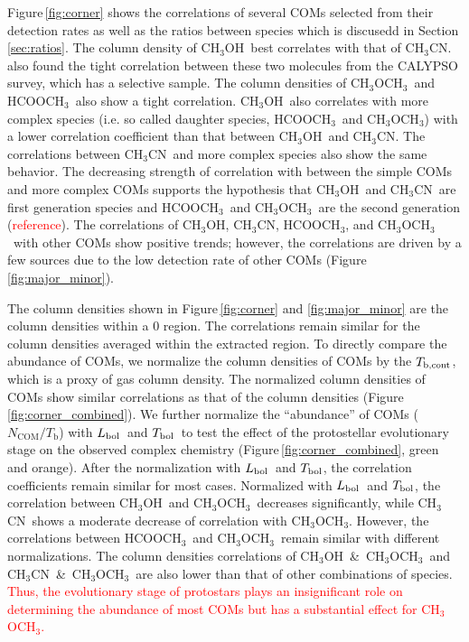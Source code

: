 \documentclass[twocolumn]{aastex62}
\newcommand{\lbol}{\mbox{$L_{\rm bol}$}}
\newcommand{\tbol}{\mbox{$T_{\rm bol}$}}
\newcommand{\tbc}{\mbox{$T_{\rm b, cont}$}}
\newcommand{\methylformate}{\mbox{HCOOCH$_{3}$}}
\newcommand{\methanol}{\mbox{CH$_{3}$OH}}
\newcommand{\dimethylether}{\mbox{CH$_{3}$OCH$_{3}$}}
\newcommand{\methylcyanide}{\mbox{CH$_{3}$CN}}
\newcommand{\refnote}{\textcolor{red}{reference}}
\begin{document}
Figure\,\ref{fig:corner} shows the correlations of several COMs selected from their detection rates as well as the ratios between species which is discusedd in Section\,\ref{sec:ratios}.  The column density of \methanol\ best correlates with that of \methylcyanide.  \citet{2020A&A...635A.198B} also found the tight correlation between these two molecules from the CALYPSO survey, which has a selective sample.  The column densities of \dimethylether\ and \methylformate\ also show a tight correlation.  \methanol\ also correlates with more complex species (i.e. so called daughter species, \methylformate\ and \dimethylether) with a lower correlation coefficient than that between \methanol\ and \methylcyanide.  The correlations between \methylcyanide\ and more complex species also show the same behavior.  The decreasing strength of correlation with between the simple COMs and more complex COMs supports the hypothesis that \methanol\ and \methylcyanide\ are first generation species and \methylformate\ and \dimethylether\ are the second generation (\refnote).  The correlations of \methanol, \methylcyanide, \methylformate, and \dimethylether\ with other COMs show positive trends; however, the correlations are driven by a few sources due to the low detection rate of other COMs (Figure\,\ref{fig:major_minor}).

The column densities shown in Figure\,\ref{fig:corner} and \ref{fig:major_minor} are the column densities within a 0 region.  The correlations remain similar for the column densities averaged within the extracted region.  To directly compare the abundance of COMs, we normalize the column densities of COMs by the \tbc, which is a proxy of gas column density.  The normalized column densities of COMs show similar correlations as that of the column densities (Figure\,\ref{fig:corner_combined}).  We further normalize the ``abundance'' of COMs ($N_\text{COM}/T_\text{b}$) with \lbol\ and \tbol\ to test the effect of the protostellar evolutionary stage on the observed complex chemistry (Figure\,\ref{fig:corner_combined}, green and orange).  After the normalization with \lbol\ and \tbol, the correlation coefficients remain similar for most cases.  Normalized with \lbol\ and \tbol, the correlation between \methanol\ and \dimethylether\ decreases significantly, while \methylcyanide\ shows a moderate decrease of correlation with \dimethylether.  However, the correlations between \methylformate\ and \dimethylether\ remain similar with different normalizations.  The column densities correlations of \methanol\ \&\ \dimethylether\ and \methylcyanide\ \&\ \dimethylether\ are also lower than that of other combinations of species.  
\textcolor{red}{Thus, the evolutionary stage of protostars plays an insignificant role on determining the abundance of most COMs but has a substantial effect for \dimethylether.}
\end{document}
